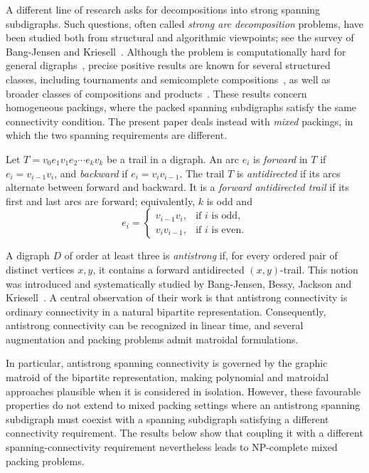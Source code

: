 \documentclass[12pt]{article}
\theoremstyle{remark}
\begin{document}
A different line of research asks for decompositions into strong
spanning subdigraphs.  Such questions, often called \emph{strong arc
decomposition} problems, have been studied both from structural and
algorithmic viewpoints; see the survey of Bang-Jensen and
Kriesell~\cite{BJKsurvey}.  Although the problem is computationally
hard for general digraphs~\cite{BY}, precise positive results are known
for several structured classes, including tournaments and semicomplete
compositions~\cite{BJGY,BJY}, as well as broader classes of compositions
and products~\cite{SGA}.  These results concern homogeneous packings,
where the packed spanning subdigraphs satisfy the same connectivity
condition.  The present paper deals instead with \emph{mixed} packings,
in which the two spanning requirements are different.

Let $T=v_0e_1v_1e_2\cdots e_kv_k$ be a trail in a digraph.  An arc $e_i$ is \emph{forward} in $T$
if $e_i=v_{i-1}v_i$, and \emph{backward} if
$e_i=v_iv_{i-1}$.  The trail $T$ is \emph{antidirected} if its arcs alternate between forward and backward.  It is a
\emph{forward antidirected trail} if its first and last arcs are forward; equivalently, $k$ is odd and
\[
   e_i=
   \begin{cases}
      v_{i-1}v_i, & \text{if $i$ is odd},\\
      v_iv_{i-1}, & \text{if $i$ is even}.
   \end{cases}
\]

A digraph $D$ of order at least three is \emph{antistrong} if, for every ordered pair of distinct vertices $x,y$, it contains a forward antidirected $(x,y)$-trail.  This notion was introduced and
systematically studied by Bang-Jensen, Bessy, Jackson and Kriesell~\cite{BBJK}.  A central observation of their work is that antistrong connectivity is ordinary connectivity in a natural
bipartite representation.  Consequently, antistrong connectivity can be recognized in linear time, and several augmentation and
packing problems admit matroidal formulations.

In particular, antistrong spanning connectivity is governed by the graphic matroid of the bipartite representation, making polynomial and matroidal approaches plausible when it is considered in isolation.  However, these favourable properties do not extend to mixed packing settings where an antistrong spanning subdigraph must coexist with a spanning subdigraph satisfying a different connectivity requirement. The results below show that coupling it with a different
spanning-connectivity requirement nevertheless leads to NP-complete mixed packing problems.
\end{document}
